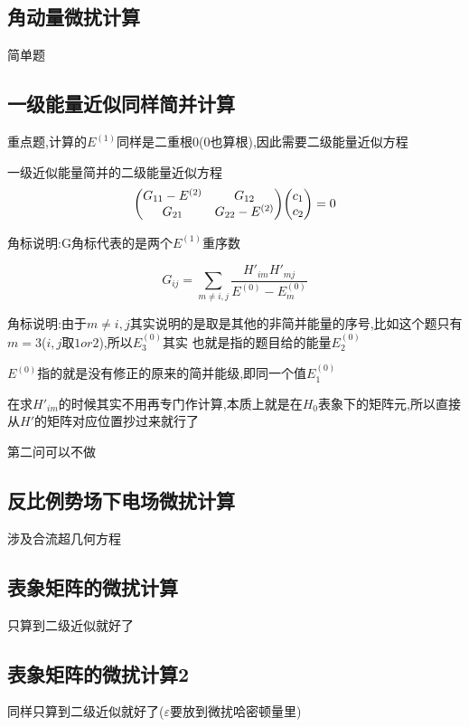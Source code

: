         \subsection{角动量微扰计算}
            简单题

        \subsection{一级能量近似同样简并计算}
            重点题,计算的$E^{(1)}$同样是二重根$0$(0也算根),因此需要二级能量近似方程

            \begin{formal}
                一级近似能量简并的二级能量近似方程
                $$
                \mqty(G_{11}-E^{(2)} & G_{12} \\ G_{21} & G_{22}-E^{(2)}) \mqty(c_{1} \\ c_{2}) = 0
                $$

                角标说明:G角标代表的是两个$E^{(1)}$重序数

                $$
                G_{ij} = \sum\limits_{m \neq i,j} \dfrac{H'_{im} H'_{mj}}{E^{(0)} - E_{m}^{(0)}}
                $$

                角标说明:由于$m \neq i,j$其实说明的是取是其他的非简并能量的序号,比如这个题只有$m=3$($i,j$取$1or2$),所以$E_{3}^{(0)}$其实
                也就是指的题目给的能量$E_{2}^{(0)}$

                $ E^{(0)} $指的就是没有修正的原来的简并能级,即同一个值$E_{1}^{(0)}$

                在求$H'_{im}$的时候其实不用再专门作计算,本质上就是在$H_{0}$表象下的矩阵元,所以直接从$H'$的矩阵对应位置抄过来就行了

            \end{formal}  

            第二问可以不做
        \subsection{反比例势场下电场微扰计算}
            涉及合流超几何方程
        
        \subsection{表象矩阵的微扰计算}
            只算到二级近似就好了 
        
        \subsection{表象矩阵的微扰计算2}
            同样只算到二级近似就好了($\varepsilon$要放到微扰哈密顿量里)
        
